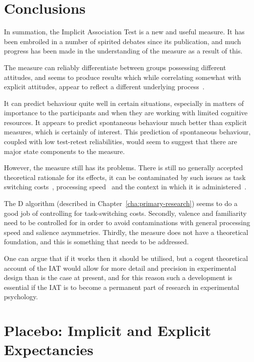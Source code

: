 \section{Conclusions}
\label{sec:conclusions-intro}


In summation, the Implicit Association Test is a new and useful measure. It has been embroiled in a number of spirited debates since its publication, and much progress has been made in the understanding of the measure as a result of this. 

The measure can reliably differentiate between groups possessing different attitudes, and seems to produce results which while correlating somewhat with explicit attitudes, appear to reflect a different underlying process~\cite{Nosek2007a}. 

It can predict behaviour quite well in certain situations, especially in matters of importance to the participants and when they are working with limited cognitive resources. It appears to predict spontaneous behaviour much better than explicit measures, which is certainly of interest. This prediction of spontaneous behaviour, coupled with low test-retest reliabilities, would seem to suggest that there are major state components to the measure. 

However, the measure still has its problems. There is still no generally accepted theoretical rationale for its effects, it can be contaminated by such issues as task switching costs~\cite{Klauer2005}, processing speed~\cite{Blanton2006} and the context in which it is administered~\cite{Boysen2006}. 

The D algorithm (described in Chapter~\ref{cha:primary-research}) seems to do a good job of controlling for task-switching costs. Secondly, valence and familiarity need to be controlled for in order to avoid contaminations with general processing speed and salience asymmetries. Thirdly, the measure does not have a theoretical foundation, and this is something that needs to be addressed. 

One can argue that if it works then it should be utilised, but a cogent theoretical account of the IAT would allow for more detail and precision in experimental design  than is the case at present, and for this reason such a development is essential if the IAT is to become a permanent part of research in experimental psychology.



\section{Placebo: Implicit and Explicit Expectancies}
\label{sec:measurement-placebo}



